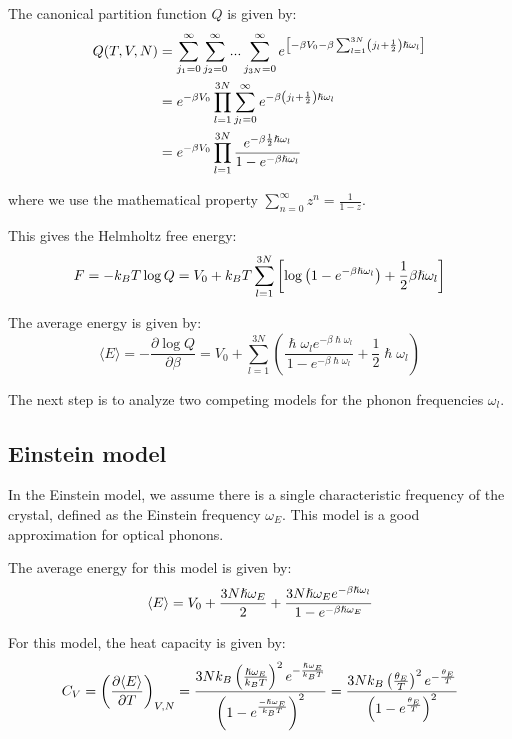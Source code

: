 \documentclass[book.tex]{subfiles}
\begin{document}
The canonical partition function $Q$ is given by:
\begin{align}\label{Eq21}
Q(T,V,N) &= \sum_{j_1 = 0}^\infty \sum_{j_2 = 0}^\infty ... \sum_{j_{3N} = 0}^\infty e^{\left[ -\beta V_0 - \beta \sum_{l=1}^{3N} \left(j_l + \frac{1}{2}\right)\hslash\omega_l \right]} \notag\\
&= e^{ -\beta V_0 } \prod_{l=1}^{3N} \sum_{j_l = 0}^\infty e^{-\beta\left(j_l + \frac{1}{2}\right)\hslash\omega_l} \notag\\
&=e^{ -\beta V_0 } \prod_{l=1}^{3N} \frac{e^{-\beta\frac{1}{2}\hslash\omega_l}}{1 - e^{-\beta\hslash\omega_l}}
\end{align}

\noindent where we use the mathematical property $\sum_{n=0}^\infty z^n= \frac{1}{1 - z}$.

This gives the Helmholtz free energy:
\begin{equation}
F = -k_BT\log Q = V_0 + k_BT \sum_{l=1}^{3N}\left[\log\left(1-e^{-\beta\hslash\omega_l}\right) + \frac{1}{2}\beta\hslash\omega_l \right] \notag
\end{equation}

The average energy is given by:
\begin{equation}\label{Eq.E_Phonons}
\langle E \rangle = -\frac{\partial \log Q}{\partial \beta} = V_0 + \sum_{l=1}^{3N} \left( \frac{\hslash\omega_le^{-\beta\hslash\omega_l}}{1 - e^{-\beta\hslash\omega_l}} + \frac{1}{2}\hslash\omega_l \right)
\end{equation}

The next step is to analyze two competing models for the phonon frequencies $\omega_l$.

\subsection{Einstein model}

In the Einstein model, we assume there is a single characteristic
frequency of the crystal, defined as the Einstein frequency $\omega_E$. This model is a good approximation for optical phonons.

The average energy for this model is given by:
\begin{equation}
\langle E \rangle = V_0 + \frac{3N\hslash\omega_E}{2} + \frac{3N\hslash\omega_Ee^{-\beta\hslash\omega_l}}{1-e^{-\beta\hslash\omega_E}} \notag	
\end{equation}

For this model, the heat capacity is given by:
\begin{equation}
C_V = \left( \frac{\partial \langle E \rangle}{\partial T} \right)_{V,N} =  \frac{3Nk_B \left( \frac{\hslash\omega_E}{k_BT} \right) ^2 e^{-\frac{\hslash\omega_E}{k_BT}}}{\left(1-e^{\frac{-\hslash\omega_E}{k_BT}}\right)^2} = \frac{3Nk_B \left( \frac{\theta_E}{T} \right) ^2 e^{-\frac{\theta_E}{T}}}{\left(1-e^{\frac{\theta_E}{T}}\right)^2} \notag
\end{equation}
\end{document}
